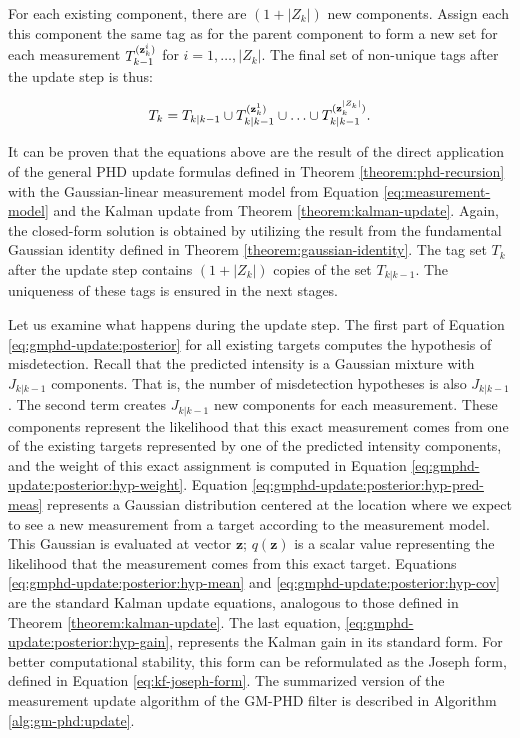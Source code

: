 \begin{theorem}
    \noindent For each existing component, there are $(1 + |Z_k|)$ new components. Assign each this component the same tag as for the parent component to form a new set for each measurement $T_{k-1}^{(\svecat{z}{k}{i})}$ for $i = 1, \ldots, |Z_k|$. The final set of non-unique tags after the update step is thus:

    \begin{equation}
        T_k = T_{k|k-1} \cup T_{k|k-1}^{(\svecat{z}{k}{1})} \cup \ldots \cup T_{k|k-1}^{(\svecat{z}{k}{|Z_k|})}.
    \end{equation}
\end{theorem}

It can be proven that the equations above are the result of the direct application of the general PHD update formulas defined in Theorem \ref{theorem:phd-recursion} with the Gaussian-linear measurement model from Equation \ref{eq:measurement-model} and the Kalman update from Theorem \ref{theorem:kalman-update}. Again, the closed-form solution is obtained by utilizing the result from the fundamental Gaussian identity defined in Theorem \ref{theorem:gaussian-identity}. The tag set $T_k$ after the update step contains $(1 + |Z_k|)$ copies of the set $T_{k|k-1}$. The uniqueness of these tags is ensured in the next stages.

Let us examine what happens during the update step. The first part of Equation \ref{eq:gmphd-update:posterior} for all existing targets computes the hypothesis of misdetection. Recall that the predicted intensity is a Gaussian mixture with $J_{k|k-1}$ components. That is, the number of misdetection hypotheses is also $J_{k|k-1}$. The second term creates $J_{k|k-1}$ new components for each measurement. These components represent the likelihood that this exact measurement comes from one of the existing targets represented by one of the predicted intensity components, and the weight of this exact assignment is computed in Equation \ref{eq:gmphd-update:posterior:hyp-weight}. Equation \ref{eq:gmphd-update:posterior:hyp-pred-meas} represents a Gaussian distribution centered at the location where we expect to see a new measurement from a target according to the measurement model. This Gaussian is evaluated at vector $\mathbf{z}$; $q(\mathbf{z})$ is a scalar value representing the likelihood that the measurement comes from this exact target. Equations \ref{eq:gmphd-update:posterior:hyp-mean} and \ref{eq:gmphd-update:posterior:hyp-cov} are the standard Kalman update equations, analogous to those defined in Theorem \ref{theorem:kalman-update}. The last equation, \ref{eq:gmphd-update:posterior:hyp-gain}, represents the Kalman gain in its standard form. For better computational stability, this form can be reformulated as the Joseph form, defined in Equation \ref{eq:kf-joseph-form}. The summarized version of the measurement update algorithm of the GM-PHD filter is described in Algorithm \ref{alg:gm-phd:update}.

